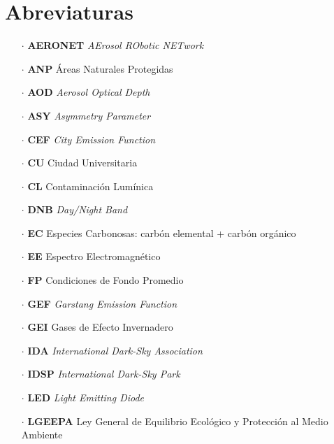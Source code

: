 \chapter{Abreviaturas}

\begin{itemize}

\item[$\cdot$] \textbf{AERONET} \textit{AErosol RObotic NETwork}

\item[$\cdot$] \textbf{ANP} Áreas Naturales Protegidas

\item[$\cdot$] \textbf{AOD} \textit{Aerosol Optical Depth}

\item[$\cdot$] \textbf{ASY} \textit{Asymmetry Parameter}

\item[$\cdot$] \textbf{CEF} \textit{City Emission Function}

\item[$\cdot$] \textbf{CU} Ciudad Universitaria

\item[$\cdot$] \textbf{CL} Contaminación Lumínica

\item[$\cdot$] \textbf{DNB} \textit{Day/Night Band}

\item[$\cdot$] \textbf{EC} Especies Carbonosas: carbón elemental + carbón orgánico

\item[$\cdot$] \textbf{EE} Espectro Electromagnético

\item[$\cdot$] \textbf{FP} Condiciones de Fondo Promedio

\item[$\cdot$] \textbf{GEF} \textit{Garstang Emission Function}

\item[$\cdot$] \textbf{GEI} Gases de Efecto Invernadero

\item[$\cdot$] \textbf{IDA} \textit{International Dark-Sky Association}


\item[$\cdot$] \textbf{IDSP} \textit{International Dark-Sky Park}

\item[$\cdot$] \textbf{LED} \textit{Light Emitting Diode}

\item[$\cdot$] \textbf{LGEEPA} Ley General de Equilibrio Ecológico y Protección al Medio Ambiente


\end{itemize}
